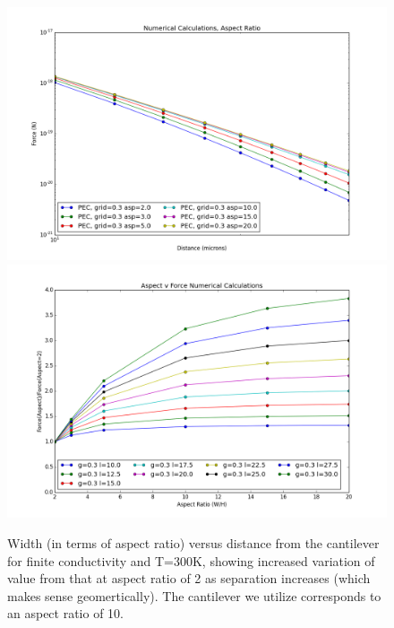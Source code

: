 \documentclass[11pt,traditabstract]{article}
\begin{document}
\begin{figure}[h]
\centering
\includegraphics[width=5in]{force_v_aspect_finite}
\includegraphics[width=5in]{aspect_correction_finite}
\caption{Width (in terms of aspect ratio) versus distance from the cantilever for finite conductivity and T=300K, showing increased variation of value from that at aspect ratio of 2 as separation increases (which makes sense geomertically). The cantilever we utilize corresponds to an aspect ratio of 10.}\label{fig:aspectFinite}
\end{figure}
\end{document}
